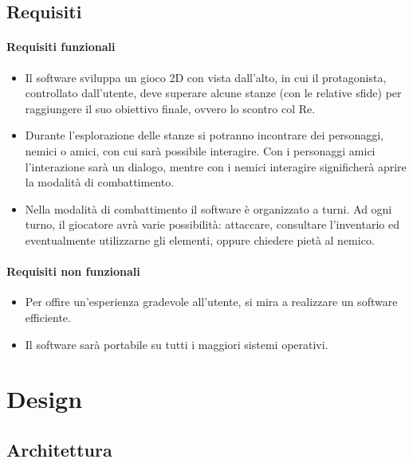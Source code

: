 \documentclass[a4paper,12pt]{report}
\begin{document}
\section{Requisiti}

\subsubsection{Requisiti funzionali}
\begin{itemize}
	\item Il software sviluppa un gioco 2D con vista dall'alto, in cui il protagonista, controllato dall'utente,
	deve superare alcune stanze (con le relative sfide) per raggiungere il suo obiettivo finale, ovvero lo scontro
	col Re.
	\item Durante l'esplorazione delle stanze si potranno incontrare dei personaggi, nemici o amici, con cui sarà 
	possibile interagire. Con i personaggi amici l'interazione sarà un dialogo, mentre con i nemici interagire 
	significherà aprire la modalità di combattimento.
	\item Nella modalità di combattimento il software è organizzato a turni. Ad ogni turno, il giocatore avrà varie 
	possibilità: attaccare, consultare l'inventario ed eventualmente utilizzarne gli elementi, oppure chiedere pietà 
	al nemico.
\end{itemize}

\subsubsection{Requisiti non funzionali}
\begin{itemize}
	\item Per offire un'esperienza gradevole all'utente, si mira a realizzare un software efficiente.
	\item Il software sarà portabile su tutti i maggiori sistemi operativi.
\end{itemize}

\chapter{Design}

\section{Architettura}
\end{document}
